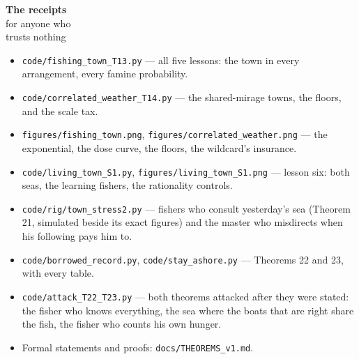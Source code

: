 \begin{receipts}{\textbf{The receipts}\\for anyone who\\trusts nothing}


\begin{itemize}
\tightlist
\item
  \texttt{code/\allowbreak{}fishing\_\allowbreak{}town\_\allowbreak{}T13.\allowbreak{}py} --- all five lessons: the town in every
  arrangement, every famine probability.
\item
  \texttt{code/\allowbreak{}correlated\_\allowbreak{}weather\_\allowbreak{}T14.\allowbreak{}py} --- the shared-mirage towns, the
  floors, and the scale tax.
\item
  \texttt{figures/\allowbreak{}fishing\_\allowbreak{}town.\allowbreak{}png}, \texttt{figures/\allowbreak{}correlated\_\allowbreak{}weather.\allowbreak{}png} --- the
  exponential, the dose curve, the floors, the wildcard's insurance.
\item
  \texttt{code/\allowbreak{}living\_\allowbreak{}town\_\allowbreak{}S1.\allowbreak{}py}, \texttt{figures/\allowbreak{}living\_\allowbreak{}town\_\allowbreak{}S1.\allowbreak{}png} --- lesson
  six: both seas, the learning fishers, the rationality controls.
\item
  \texttt{code/\allowbreak{}rig/\allowbreak{}town\_\allowbreak{}stress2.\allowbreak{}py} --- fishers who consult yesterday's sea
  (Theorem 21, simulated beside its exact figures) and the master who
  misdirects when his following pays him to.
\item
  \texttt{code/\allowbreak{}borrowed\_\allowbreak{}record.\allowbreak{}py}, \texttt{code/\allowbreak{}stay\_\allowbreak{}ashore.\allowbreak{}py} --- Theorems 22 and
  23, with every table.
\item
  \texttt{code/\allowbreak{}attack\_\allowbreak{}T22\_\allowbreak{}T23.\allowbreak{}py} --- both theorems attacked after they were
  stated: the fisher who knows everything, the sea where the boats
  that are right share the fish, the fisher who counts his own hunger.
\item
  Formal statements and proofs: \texttt{docs/\allowbreak{}THEOREMS\_\allowbreak{}v1.\allowbreak{}md}.
\end{itemize}

\end{receipts}


